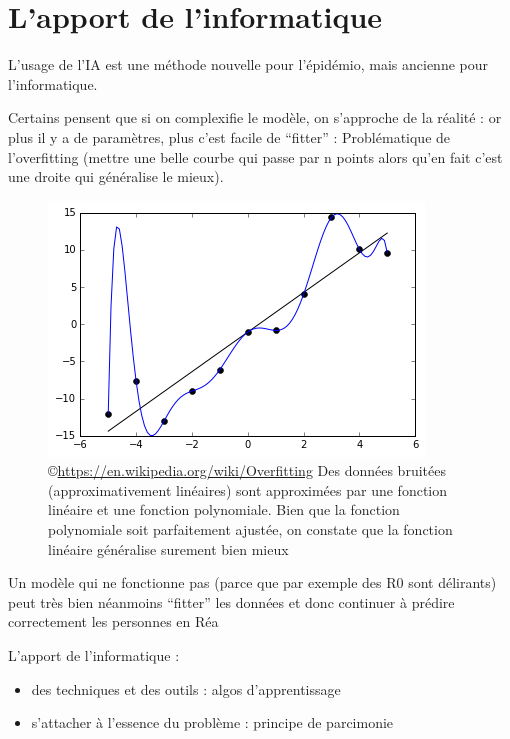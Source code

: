 \documentclass[review]{elsarticle}
\begin{document}
\section{L'apport de l'informatique}

L'usage de l'IA est une méthode nouvelle pour l'épidémio, mais ancienne pour l'informatique.


Certains pensent que si on complexifie le modèle, on s'approche de la réalité : or plus il y a de paramètres, plus c'est facile de ``fitter'' : Problématique de l'overfitting (mettre une belle courbe qui passe par n points alors qu'en fait c'est une droite qui généralise le mieux).


\begin{figure}[h]
  \includegraphics[width=0.8\linewidth]{Overfitted_Data.png}  
  \centering
  \caption{\copyright \href{wikipedia}{https://en.wikipedia.org/wiki/Overfitting}  Des données bruitées (approximativement linéaires) sont approximées par une fonction linéaire et une fonction polynomiale. Bien que la fonction polynomiale soit parfaitement ajustée, on constate que la fonction linéaire généralise surement bien mieux}
  \label{fig:overfitting}
\end{figure}


Un modèle qui ne fonctionne pas (parce que par exemple des R0 sont délirants) peut très bien néanmoins ``fitter'' les données  et donc continuer à prédire correctement les personnes en Réa


L'apport de l'informatique :
\begin{itemize}
\item des techniques et des outils : algos d'apprentissage
\item s'attacher à l'essence du problème : principe de parcimonie
\end{itemize}
\end{document}

